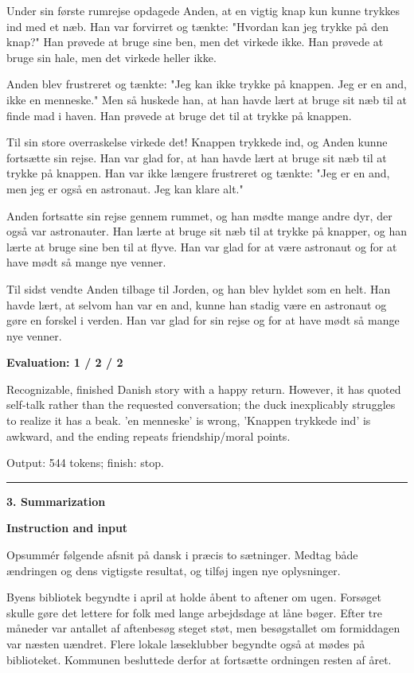 \documentclass[10pt]{article}
\begin{document}
{\begin{minipage}{\textwidth}
\par\smallskip
Under sin første rumrejse opdagede Anden, at en vigtig knap kun kunne trykkes ind med et næb. Han var forvirret og tænkte: "Hvordan kan jeg trykke på den knap?" Han prøvede at bruge sine ben, men det virkede ikke. Han prøvede at bruge sin hale, men det virkede heller ikke.
\par\smallskip
Anden blev frustreret og tænkte: "Jeg kan ikke trykke på knappen. Jeg er en and, ikke en menneske." Men så huskede han, at han havde lært at bruge sit næb til at finde mad i haven. Han prøvede at bruge det til at trykke på knappen.
\par\smallskip
Til sin store overraskelse virkede det! Knappen trykkede ind, og Anden kunne fortsætte sin rejse. Han var glad for, at han havde lært at bruge sit næb til at trykke på knappen. Han var ikke længere frustreret og tænkte: "Jeg er en and, men jeg er også en astronaut. Jeg kan klare alt."
\par\smallskip
Anden fortsatte sin rejse gennem rummet, og han mødte mange andre dyr, der også var astronauter. Han lærte at bruge sit næb til at trykke på knapper, og han lærte at bruge sine ben til at flyve. Han var glad for at være astronaut og for at have mødt så mange nye venner.
\par\smallskip
Til sidst vendte Anden tilbage til Jorden, og han blev hyldet som en helt. Han havde lært, at selvom han var en and, kunne han stadig være en astronaut og gøre en forskel i verden. Han var glad for sin rejse og for at have mødt så mange nye venner.\par\smallskip
\textbf{Evaluation: 1 / 2 / 2}\par Recognizable, finished Danish story with a happy return. However, it has quoted self-talk rather than the requested conversation; the duck inexplicably struggles to realize it has a beak. 'en menneske' is wrong, 'Knappen trykkede ind' is awkward, and the ending repeats friendship/moral points.
\par {\color{gray} Output: 544 tokens; finish: stop.}\par
\medskip\hrule\smallskip
{\bfseries 3. Summarization}\par\smallskip
\textbf{Instruction and input}\par Opsummér følgende afsnit på dansk i præcis to sætninger. Medtag både ændringen og dens vigtigste resultat, og tilføj ingen nye oplysninger.
\par\smallskip
Byens bibliotek begyndte i april at holde åbent to aftener om ugen. Forsøget skulle gøre det lettere for folk med lange arbejdsdage at låne bøger. Efter tre måneder var antallet af aftenbesøg steget støt, men besøgstallet om formiddagen var næsten uændret. Flere lokale læseklubber begyndte også at mødes på biblioteket. Kommunen besluttede derfor at fortsætte ordningen resten af året.\par\smallskip

\end{minipage}}
\end{document}
